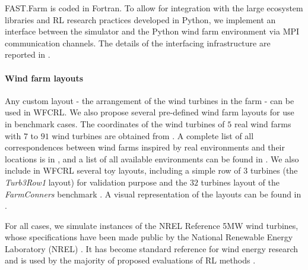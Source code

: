 \documentclass{article}
\newcommand{\jz}[1]{{\color{blue}#1}}
\newcommand{\md}[1]{{\color{red}#1}}
\begin{document}
%
FAST.Farm is coded in Fortran. To allow for integration with the large ecosystem libraries and RL research practices developed in Python, we implement an interface between the simulator and the Python wind farm environment via MPI communication channels. The details of the interfacing infrastructure are reported in .

\paragraph{Wind farm layouts}  
Any custom layout - the arrangement of the wind turbines in the farm - can be used in WFCRL. We also propose several pre-defined wind farm layouts for use in benchmark cases. The coordinates of the wind turbines of $5$ real wind farms with $7$ to $91$ wind turbines are obtained from \cite{abritta2023plants}. A complete list of all correspondences between wind farms inspired by real environments and their locations is in , and a list of all available environments can be found in . We also include in WFCRL several toy layouts, including a simple row of $3$ turbines  (the \textit{Turb3Row1} layout) for validation purpose and the $32$ turbines layout of the \textit{FarmConners} benchmark \cite{gocmen2022farmconners}. 
A visual representation of the %
layouts can be found in .

For all cases, we simulate instances of the NREL Reference 5MW wind turbines, whose specifications have been made public by the National Renewable Energy Laboratory (NREL) \cite{jonkman2009definition}. It has become standard reference for wind energy research and is used by the majority of proposed evaluations of RL methods \cite{abkar2023_rlwfc}. 
\end{document}
